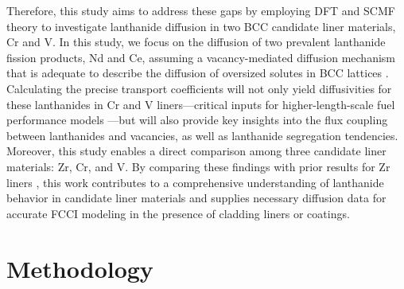 \documentclass[preprint,12pt]{elsarticle}
\begin{document}
Therefore, this study aims to address these gaps by employing DFT and SCMF theory to investigate lanthanide diffusion in two BCC candidate liner materials, Cr and V. In this study, we focus on the diffusion of two prevalent lanthanide fission products, Nd and Ce, assuming a vacancy-mediated diffusion mechanism that is adequate to describe the diffusion of oversized solutes in BCC lattices \cite{yang_significant_2023, bocquet_migration_2017}. Calculating the precise transport coefficients will not only yield diffusivities for these lanthanides in Cr and V liners—critical inputs for higher-length-scale fuel performance models \cite{HIRSCHHORN2025113811}—but will also provide key insights into the flux coupling between lanthanides and vacancies, as well as lanthanide segregation tendencies. Moreover, this study enables a direct comparison among three candidate liner materials: Zr, Cr, and V. By comparing these findings with prior results for Zr liners \cite{shousha2024first}, this work contributes to a comprehensive understanding of lanthanide behavior in candidate liner materials and supplies necessary diffusion data for accurate FCCI modeling in the presence of cladding liners or coatings.



\FloatBarrier
\section{Methodology}
\end{document}
